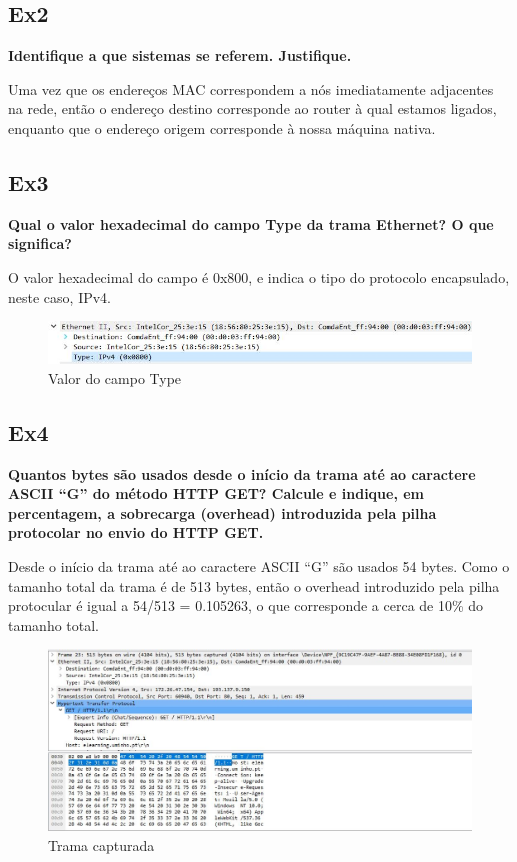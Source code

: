 \documentclass{article}
\begin{document}
\subsection{Ex2}
\textbf{Identifique a que sistemas se referem. Justifique.}\\\par
Uma vez que os endereços MAC correspondem a nós imediatamente adjacentes na rede, então o endereço destino corresponde ao router à qual estamos ligados, enquanto que o endereço origem corresponde à nossa máquina nativa.

\subsection{Ex3}
\textbf{Qual o valor hexadecimal do campo Type da trama Ethernet? O que significa?}\\\par
O valor hexadecimal do campo  é 0x800, e indica o tipo do protocolo encapsulado, neste caso, IPv4.
\begin{figure}[h]
	\centering
	\includegraphics[scale = 0.8]{campo-type-ex3.JPG}
	\caption{Valor do campo Type}
\end{figure}

\subsection{Ex4}
\textbf{Quantos bytes são usados desde o início da trama até ao caractere ASCII “G” do método HTTP GET? Calcule e indique, em percentagem, a sobrecarga (overhead) introduzida pela pilha protocolar no envio do HTTP GET.}\\\par
Desde o início da trama até ao caractere ASCII “G” são usados 54 bytes. Como o tamanho total da trama é de 513 bytes, então o overhead introduzido pela pilha protocular é igual a 54/513 = 0.105263, o que corresponde a cerca de 10\% do tamanho total.
\newpage
\begin{figure}[h]
	\centering
	\includegraphics[scale = 0.5]{tamanho-mensagem-ex4.JPG}
	\caption{Trama capturada}
\end{figure} 
\end{document}
